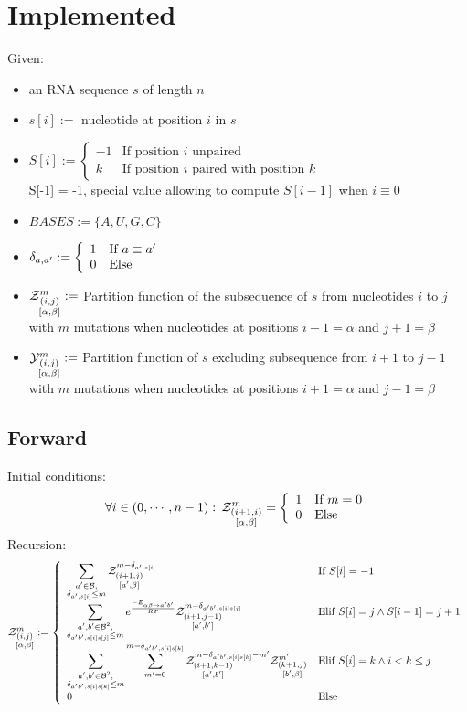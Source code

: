 \documentclass[11pt]{article} %
\begin{document}
\section{Implemented}
Given:
\begin{itemize}
	\item an RNA sequence $s$ of length $n$
	\item $s[i]:=$ nucleotide at position $i$ in $s$
	\item $\displaystyle
		S[i]:=\left\{
		\begin{array}{rl}
			-1 & \text{If position }i \text{ unpaired}\\
	 		k  & \text{If position }i \text{ paired with position }k
		\end{array}\right.
		$\\
		S[-1] = -1, special value allowing to compute $S[i-1]$ when $i\equiv 0$
	\item $BASES:=\{A, U, G, C\}$
	\item $ \delta_{a,a'}:=\left\{
		\begin{array}{ll}
			1 &\text{If }a \equiv a'\\
			0 &\text{Else}
		\end{array}\right.$
	\item $\Z{i,j}{m}{\alpha,\beta}:=$ Partition function of the subsequence of $s$ from nucleotides $i$ to $j$ with $m$ mutations when nucleotides at positions $i-1=\alpha$ and $j+1=\beta$
	\item $\Y{i,j}{m}{\alpha,\beta}:=$ Partition function of $s$ excluding subsequence  from $i+1$ to $j-1$ with $m$ mutations when nucleotides at positions $i+1=\alpha$ and $j-1=\beta$ 	\end{itemize}
\subsection{Forward}
Initial conditions:
$$
	\forall i \in (0,\cdots,n-1):\, \Z{i+1,i}{m}{\alpha,\beta}=\left\{
	\begin{array}{ll}
		1 &\text{If } m = 0\\
		0 &\text{Else }
	\end{array}\right.
$$
Recursion:
$$
	\Z{i,j}{m}{\alpha,\beta}:=\left\{
  \begin{array}{ll}
  		\displaystyle
      \sum_{\substack{a'\in \B,\\ \Kron_{a',s[i]}\le m}}  
      \Z{i+1,j}{m-\Kron_{a',s[i]}}{a',\beta} & \text{If }S{[i]}=-1\\
      \displaystyle
      \sum_{\substack{a',b'\in \B^2,\\ \Kron_{a'b',s[i]s[j]}\le m}}  
			 e^{\frac{-E_{\alpha \beta \to a' b'}}{RT}}
			 \Z{i+1,j-1}{m-\Kron_{a'b',s[i]s[j]}}{a',b'}&
			 \text{Elif }S{[i]}=j \land S{[i-1]}=j+1\\
			 \displaystyle
      \sum_{\substack{a',b'\in \B^2,\\ \Kron_{a'b',s[i]s[k]}\le m}}
      \sum_{m'=0}^{m-\Kron_{a'b',s[i]s[k]}}
      \Z{i+1,k-1}{m-\Kron_{a'b',s[i]s[k]}-m'}{a',b'}
      \Z{k+1,j}{m'}{b',\beta} & \text{Elif }S[i]=k \land i < k \leq j\\
      0 &\text{Else}
	\end{array}\right.
$$
\end{document}
